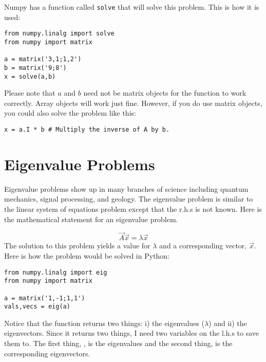 Numpy has a function called \texttt{solve} that will solve this
problem.  This is how it is used:
\begin{Verbatim}
from numpy.linalg import solve
from numpy import matrix

a = matrix('3,1;1,2')
b = matrix('9;8')
x = solve(a,b)
\end{Verbatim}
Please note that $a$ and $b$ need not be matrix objects for the
 function to work correctly.  Array objects will work just
fine.  However, if you do use matrix objects, you could also solve the
problem like this:
\begin{Verbatim}
x = a.I * b # Multiply the inverse of A by b.
\end{Verbatim}


\section{Eigenvalue Problems}
Eigenvalue problems show up in many branches of science
including quantum mechanics, signal processing, and geology. The
eigenvalue problem is similar to the linear system of equations
problem except that the r.h.s is not known.  Here is the mathematical
statement for an eigenvalue problem.

\begin{equation}
\vec{A}\vec{x} = \lambda \vec{x}
\end{equation}
The solution to this problem yields a value for $\lambda$ and a
corresponding vector, $\vec{x}$.  Here is how the
problem would be solved in Python:
\begin{Verbatim}
from numpy.linalg import eig
from numpy import matrix

a = matrix('1,-1;1,1')
vals,vecs = eig(a)
\end{Verbatim}
Notice that the function  returns two things: i) the
eigenvalues ($\lambda$) and ii) the eigenvectors.  Since it returns
two things, I need two variables on the l.h.s to save them to.  The
first thing, , is the eigenvalues and the second thing,  is the corresponding
eigenvectors.
